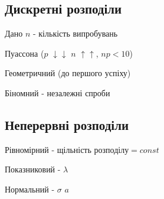 \documentclass{article}
\begin{document}
\begin{Large}
\subsection*{Дискретні розподіли}
Дано $n$ - кількість випробувань
\begin{list}{-}{}
	\item Пуассона ($p$ $\downarrow\downarrow$ $n$ $\uparrow\uparrow$, $np < 10$)
	\item Геометричний (до першого успіху)
	\item Біномний - незалежні спроби
\end{list}
\subsection*{Неперервні розподіли}
\begin{list}{-}{}
	\item Рівномірний - $\text{щільність розподілу} = const$
	\item Показниковий - $\lambda$
	\item Нормальний - $\sigma$ $a$
\end{list}
\end{Large}
\end{document}

